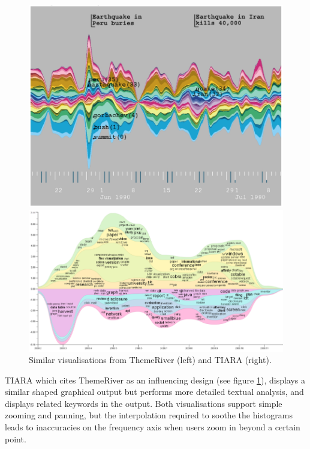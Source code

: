 \begin{figure}[h]
\centering
\begin{minipage}{.45\textwidth}
  \centering
  \hspace{-1cm}\includegraphics[width=.9\linewidth]{img/lit-survey/histogram1.png}
  \end{minipage}%
\begin{minipage}{.65\textwidth}
  \centering
  \hspace{-1.5cm}\includegraphics[width=.9\linewidth]{img/lit-survey/histogram2.png}
\end{minipage}
\caption{Similar visualisations from ThemeRiver \citep{ThemeRiver} (left) and TIARA \citep{InteractiveTopicBasedVisualTextSummarizationAndAnalysis} (right).}
  \label{fig:themeriver-tiara}

\end{figure}

TIARA \citep{InteractiveTopicBasedVisualTextSummarizationAndAnalysis} which cites ThemeRiver as an influencing design (see figure \ref{fig:themeriver-tiara}), displays a similar shaped graphical output but performs more detailed textual analysis, and displays related keywords in the output. Both visualisations support simple zooming and panning, but the interpolation required to soothe the histograms leads to inaccuracies on the frequency axis when users zoom in beyond a certain point.

